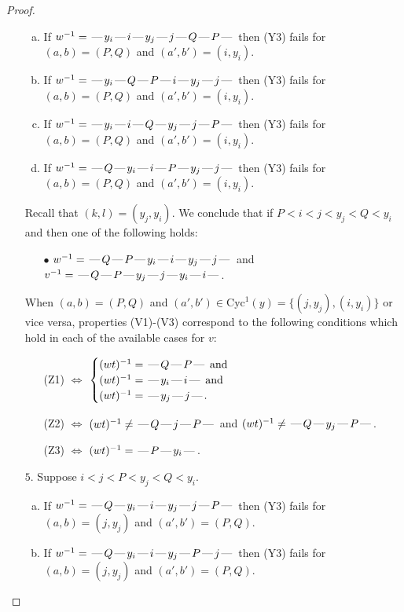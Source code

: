 \documentclass[10pt]{article}
\theoremstyle{definition}
\theoremstyle{definition}
\def\dash{\text{\hspace{0.5mm}---\hspace{0.5mm}}}
\def\Cyc{\mathrm{Cyc}}
\begin{document}
\begin{proof}
\begin{enumerate}
\begin{enumerate}[(a)]
\item If $w^{-1} = \dash y_i\dash i\dash y_j\dash j\dash Q\dash P\dash $ then (Y3) fails for $(a,b)=(P,Q)$ and $(a',b')=(i,y_i)$.
\item If $w^{-1} = \dash y_i\dash Q\dash P\dash i\dash y_j\dash j\dash $ then (Y3) fails for $(a,b)=(P,Q)$ and $(a',b')=(i,y_i)$.
\item If $w^{-1} = \dash y_i\dash i\dash Q\dash y_j\dash j\dash P\dash $ then (Y3) fails for $(a,b)=(P,Q)$ and $(a',b')=(i,y_i)$.
\item If $w^{-1} = \dash Q\dash y_i\dash i\dash P\dash y_j\dash j\dash $ then (Y3) fails for $(a,b)=(P,Q)$ and $(a',b')=(i,y_i)$.
\end{enumerate}
Recall that $(k,l) = (y_j,y_i)$.
We conclude that if $P < i < j < y_j < Q < y_i$ and then one of the following holds:
\begin{enumerate}
\item[$\bullet$] $w^{-1} = \dash Q\dash P\dash y_i\dash i\dash y_j\dash j\dash $ and $v^{-1} = \dash Q\dash P\dash y_j\dash j\dash y_i\dash i\dash $.
\end{enumerate}
When $(a,b)= (P,Q)$ and $(a',b')\in \Cyc^1(y)=\{(j,y_j),(i,y_i)\}$ or vice versa,
properties (V1)-(V3) correspond to the following conditions which hold in
each of the available cases for $v$:
\begin{enumerate}
\item[](Z1) $\Leftrightarrow$ $\begin{cases}\text{$(wt)^{-1} = \dash Q \dash P \dash$}\text{ and }\\
\text{$(wt)^{-1} = \dash y_i \dash i \dash$}\text{ and }\\
\text{$(wt)^{-1} = \dash y_j \dash j \dash$}.\end{cases}$
\item[](Z2) $\Leftrightarrow$ $(wt)^{-1} \neq \dash Q \dash j \dash P \dash$ and $(wt)^{-1}\neq \dash Q \dash y_j \dash P \dash$.
\item[](Z3) $\Leftrightarrow$ $(wt)^{-1} = \dash P \dash y_i \dash$.
\end{enumerate}
\item[$5$.] Suppose $i < j < P < y_j < Q < y_i$.
\begin{enumerate}[(a)]
\item If $w^{-1} = \dash Q\dash y_i\dash i\dash y_j\dash j\dash P\dash $ then (Y3) fails for $(a,b)=(j,y_j)$ and $(a',b')=(P,Q)$.
\item If $w^{-1} = \dash Q\dash y_i\dash i\dash y_j\dash P\dash j\dash $ then (Y3) fails for $(a,b)=(j,y_j)$ and $(a',b')=(P,Q)$.

\end{enumerate}
\end{enumerate}
\end{proof}
\end{document}
